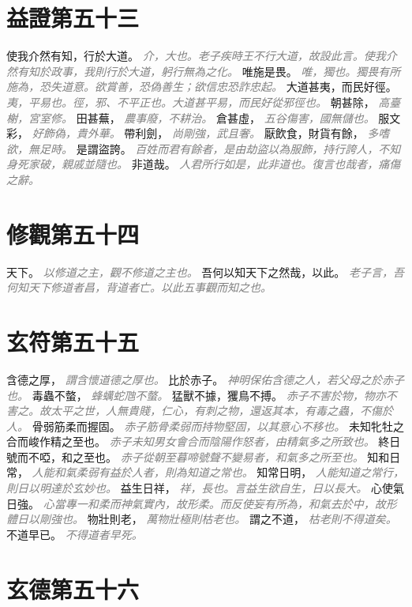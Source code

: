 \documentclass[a4paper,zihao=-4,oneside,landscape,UTF8]{ctexart}
\newcommand{\zhushi}[1]{\scriptsize{\textit{\textcolor{gray}{#1}}}\normalsize}
\begin{document}
\section{益證第五十三}

使我介然有知，行於大道。
\zhushi{介，大也。老子疾時王不行大道，故設此言。使我介然有知於政事，我則行於大道，躬行無為之化。}
唯施是畏。
\zhushi{唯，獨也。獨畏有所施為，恐失道意。欲賞善，恐偽善生；欲信忠恐詐忠起。}
大道甚夷，而民好徑。
\zhushi{夷，平易也。徑，邪、不平正也。大道甚平易，而民好從邪徑也。}
朝甚除，
\zhushi{高臺榭，宮室修。}
田甚蕪，
\zhushi{農事廢，不耕治。}
倉甚虛，
\zhushi{五谷傷害，國無儲也。}
服文彩，
\zhushi{好飾偽，貴外華。}
帶利劍，
\zhushi{尚剛強，武且奢。}
厭飲食，財貨有餘，
\zhushi{多嗜欲，無足時。}
是謂盜誇。
\zhushi{百姓而君有餘者，是由劫盜以為服飾，持行誇人，不知身死家破，親戚並隨也。}
非道哉。
\zhushi{人君所行如是，此非道也。復言也哉者，痛傷之辭。}


\section{修觀第五十四}

天下。
\zhushi{以修道之主，觀不修道之主也。}
吾何以知天下之然哉，以此。
\zhushi{老子言，吾何知天下修道者昌，背道者亡。以此五事觀而知之也。}


\section{玄符第五十五}

含德之厚，
\zhushi{謂含懷道德之厚也。}
比於赤子。
\zhushi{神明保佑含德之人，若父母之於赤子也。}
毒蟲不螫，
\zhushi{蜂蠇蛇虺不螫。}
猛獸不據，玃鳥不搏。
\zhushi{赤子不害於物，物亦不害之。故太平之世，人無貴賤，仁心，有刺之物，還返其本，有毒之蟲，不傷於人。}
骨弱筋柔而握固。
\zhushi{赤子筋骨柔弱而持物堅固，以其意心不移也。}
未知牝牡之合而峻作精之至也。
\zhushi{赤子未知男女會合而陰陽作怒者，由精氣多之所致也。}
終日號而不啞，和之至也。
\zhushi{赤子從朝至暮啼號聲不變易者，和氣多之所至也。}
知和日常，
\zhushi{人能和氣柔弱有益於人者，則為知道之常也。}
知常日明，
\zhushi{人能知道之常行，則日以明達於玄妙也。}
益生日祥，
\zhushi{祥，長也。言益生欲自生，日以長大。}
心使氣日強。
\zhushi{心當專一和柔而神氣實內，故形柔。而反使妄有所為，和氣去於中，故形體日以剛強也。}
物壯則老，
\zhushi{萬物壯極則枯老也。}
謂之不道，
\zhushi{枯老則不得道矣。}
不道早已。
\zhushi{不得道者早死。}


\section{玄德第五十六}
\end{document}
